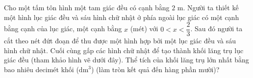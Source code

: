 \begin{ex}
Cho một tấm tôn hình một tam giác đều có cạnh bằng $2$ m. Người ta thiết kế một hình lục giác đều và sáu hình chữ nhật ở phía ngoài lục giác có một cạnh bằng cạnh của lục giác, một cạnh bằng $x$ (mét) với $0<x<\dfrac23$. Sau đó người ta cắt theo nét đứt đoạn để thu được một hình hợp bởi một lục giác đều và sáu hình chữ nhật. Cuối cùng gấp các hình chữ nhật để tạo thành khối lăng trụ lục giác đều (tham khảo hình vẽ dưới đây). Thể tích của khối lăng trụ lớn nhất bằng bao nhiêu decimét khối ($\text{dm}^3$) (làm tròn kết quả đến hàng phần mười)?
\begin{center}
\end{center}
\end{ex}
